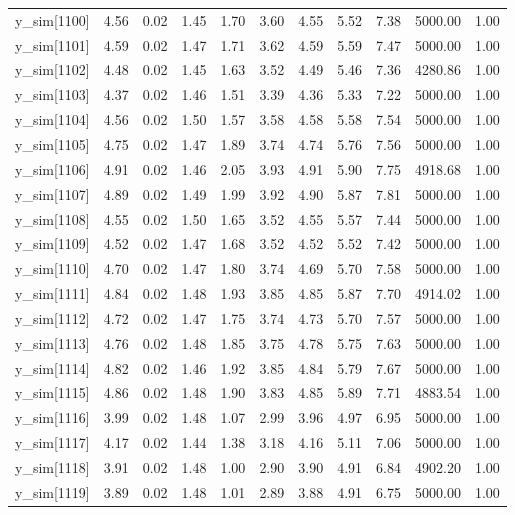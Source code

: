\begin{table}[ht]
\begin{tabular}{rrrrrrrrrrr}
  y\_sim[1100] & 4.56 & 0.02 & 1.45 & 1.70 & 3.60 & 4.55 & 5.52 & 7.38 & 5000.00 & 1.00 \\ 
  y\_sim[1101] & 4.59 & 0.02 & 1.47 & 1.71 & 3.62 & 4.59 & 5.59 & 7.47 & 5000.00 & 1.00 \\ 
  y\_sim[1102] & 4.48 & 0.02 & 1.45 & 1.63 & 3.52 & 4.49 & 5.46 & 7.36 & 4280.86 & 1.00 \\ 
  y\_sim[1103] & 4.37 & 0.02 & 1.46 & 1.51 & 3.39 & 4.36 & 5.33 & 7.22 & 5000.00 & 1.00 \\ 
  y\_sim[1104] & 4.56 & 0.02 & 1.50 & 1.57 & 3.58 & 4.58 & 5.58 & 7.54 & 5000.00 & 1.00 \\ 
  y\_sim[1105] & 4.75 & 0.02 & 1.47 & 1.89 & 3.74 & 4.74 & 5.76 & 7.56 & 5000.00 & 1.00 \\ 
  y\_sim[1106] & 4.91 & 0.02 & 1.46 & 2.05 & 3.93 & 4.91 & 5.90 & 7.75 & 4918.68 & 1.00 \\ 
  y\_sim[1107] & 4.89 & 0.02 & 1.49 & 1.99 & 3.92 & 4.90 & 5.87 & 7.81 & 5000.00 & 1.00 \\ 
  y\_sim[1108] & 4.55 & 0.02 & 1.50 & 1.65 & 3.52 & 4.55 & 5.57 & 7.44 & 5000.00 & 1.00 \\ 
  y\_sim[1109] & 4.52 & 0.02 & 1.47 & 1.68 & 3.52 & 4.52 & 5.52 & 7.42 & 5000.00 & 1.00 \\ 
  y\_sim[1110] & 4.70 & 0.02 & 1.47 & 1.80 & 3.74 & 4.69 & 5.70 & 7.58 & 5000.00 & 1.00 \\ 
  y\_sim[1111] & 4.84 & 0.02 & 1.48 & 1.93 & 3.85 & 4.85 & 5.87 & 7.70 & 4914.02 & 1.00 \\ 
  y\_sim[1112] & 4.72 & 0.02 & 1.47 & 1.75 & 3.74 & 4.73 & 5.70 & 7.57 & 5000.00 & 1.00 \\ 
  y\_sim[1113] & 4.76 & 0.02 & 1.48 & 1.85 & 3.75 & 4.78 & 5.75 & 7.63 & 5000.00 & 1.00 \\ 
  y\_sim[1114] & 4.82 & 0.02 & 1.46 & 1.92 & 3.85 & 4.84 & 5.79 & 7.67 & 5000.00 & 1.00 \\ 
  y\_sim[1115] & 4.86 & 0.02 & 1.48 & 1.90 & 3.83 & 4.85 & 5.89 & 7.71 & 4883.54 & 1.00 \\ 
  y\_sim[1116] & 3.99 & 0.02 & 1.48 & 1.07 & 2.99 & 3.96 & 4.97 & 6.95 & 5000.00 & 1.00 \\ 
  y\_sim[1117] & 4.17 & 0.02 & 1.44 & 1.38 & 3.18 & 4.16 & 5.11 & 7.06 & 5000.00 & 1.00 \\ 
  y\_sim[1118] & 3.91 & 0.02 & 1.48 & 1.00 & 2.90 & 3.90 & 4.91 & 6.84 & 4902.20 & 1.00 \\ 
  y\_sim[1119] & 3.89 & 0.02 & 1.48 & 1.01 & 2.89 & 3.88 & 4.91 & 6.75 & 5000.00 & 1.00 \\ 

\end{tabular}
\end{table}
